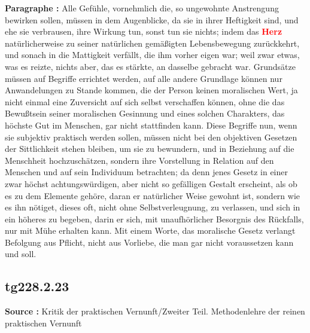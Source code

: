 \documentclass[a4paper,12pt,twoside]{book}
\newcommand{\match}[1]{\textcolor{red}{\textbf{#1}}}
\begin{document}
	\noindent\textbf{Paragraphe : }Alle Gefühle, vornehmlich die, so ungewohnte Anstrengung bewirken sollen, müssen in dem Augenblicke, da sie in ihrer Heftigkeit sind, und ehe sie verbrausen, ihre Wirkung tun, sonst tun sie nichts; indem das \match{Herz} natürlicherweise zu seiner natürlichen gemäßigten Lebensbewegung zurückkehrt, und sonach in die Mattigkeit verfällt, die ihm vorher eigen war; weil zwar etwas, was es reizte, nichts aber, das es stärkte, an dasselbe gebracht war. Grundsätze müssen auf Begriffe errichtet werden, auf alle andere Grundlage können nur Anwandelungen zu Stande kommen, die der Person keinen moralischen Wert, ja nicht einmal eine Zuversicht auf sich selbst verschaffen können, ohne die das Bewußtsein seiner moralischen Gesinnung und eines solchen Charakters, das höchste Gut im Menschen, gar nicht stattfinden  kann. Diese Begriffe nun, wenn sie subjektiv praktisch werden sollen, müssen nicht bei den objektiven Gesetzen der Sittlichkeit stehen bleiben, um sie zu bewundern, und in Beziehung auf die Menschheit hochzuschätzen, sondern ihre Vorstellung in Relation auf den Menschen und auf sein Individuum betrachten; da denn jenes Gesetz in einer zwar höchst achtungswürdigen, aber nicht so gefälligen Gestalt erscheint, als ob es zu dem Elemente gehöre, daran er natürlicher Weise gewohnt ist, sondern wie es ihn nötiget, dieses oft, nicht ohne Selbstverleugnung, zu verlassen, und sich in ein höheres zu begeben, darin er sich, mit unaufhörlicher Besorgnis des Rückfalls, nur mit Mühe erhalten kann. Mit einem Worte, das moralische Gesetz verlangt Befolgung aus Pflicht, nicht aus Vorliebe, die man gar nicht voraussetzen kann und soll. 
	
	\subsection*{tg228.2.23} 
	\textbf{Source : }Kritik der praktischen Vernunft/Zweiter Teil. Methodenlehre der reinen praktischen Vernunft\\  
	
\end{document}
